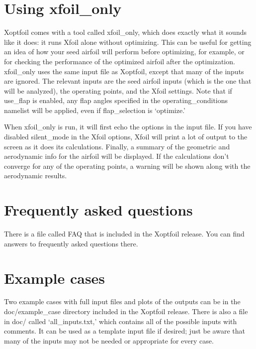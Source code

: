 \documentclass[11pt]{article}
\begin{document}
\section{Using xfoil\_only}

Xoptfoil comes with a tool called xfoil\_only, which does exactly what it sounds like it
does: it runs Xfoil alone without optimizing. This can be useful for getting an idea of
how your seed airfoil will perform before optimizing, for example, or for checking the
performance of the optimized airfoil after the optimization. xfoil\_only uses the same
input file as Xoptfoil, except that many of the inputs are ignored. The relevant
inputs are the seed airfoil inputs (which is the one that will be analyzed), the operating
points, and the Xfoil settings. Note that if use\_flap is enabled, any flap angles 
specified in the operating\_conditions namelist will be applied, even if flap\_selection
is `optimize.' 

When xfoil\_only is run, it will first echo the options in the input file. If you have
disabled silent\_mode in the Xfoil options, Xfoil will print a lot of output to the screen
as it does its calculations. Finally, a summary of the geometric and aerodynamic info for
the airfoil will be displayed. If the calculations don't converge for any of the operating
points, a warning will be shown along with the aerodynamic results.

\section{Frequently asked questions}

There is a file called FAQ that is included in the Xoptfoil release. You can find answers
to frequently asked questions there.

\section{Example cases}

Two example cases with full input files and plots of the outputs can be in the
doc/example\_case directory included in the Xoptfoil release. There is also a file in
doc/ called `all\_inputs.txt,' which contains all of the possible inputs with comments.
It can be used as a template input file if desired; just be aware that many of the inputs
may not be needed or appropriate for every case.
\end{document}
